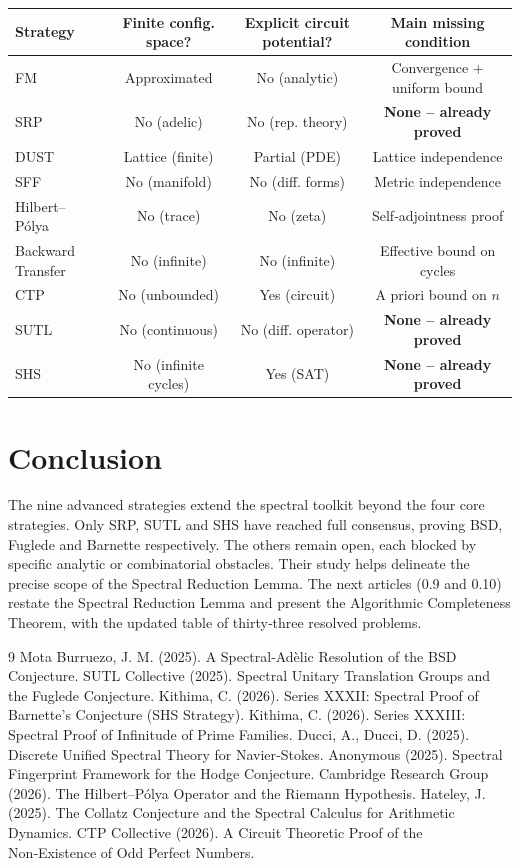 \documentclass[11pt,a4paper]{article}
\begin{document}
\begin{center}
\small
\begin{tabular}{@{}lccc@{}}
\toprule
\textbf{Strategy} & \textbf{Finite config. space?} & \textbf{Explicit circuit potential?} & \textbf{Main missing condition} \\
\midrule
FM & Approximated & No (analytic) & Convergence + uniform bound \\
SRP & No (adelic) & No (rep. theory) & \textbf{None – already proved} \\
DUST & Lattice (finite) & Partial (PDE) & Lattice independence \\
SFF & No (manifold) & No (diff. forms) & Metric independence \\
Hilbert–Pólya & No (trace) & No (zeta) & Self‑adjointness proof \\
Backward Transfer & No (infinite) & No (infinite) & Effective bound on cycles \\
CTP & No (unbounded) & Yes (circuit) & A priori bound on \(n\) \\
SUTL & No (continuous) & No (diff. operator) & \textbf{None – already proved} \\
SHS & No (infinite cycles) & Yes (SAT) & \textbf{None – already proved} \\
\bottomrule
\end{tabular}
\end{center}

\section{Conclusion}

The nine advanced strategies extend the spectral toolkit beyond the four core strategies. Only SRP, SUTL and SHS have reached full consensus, proving BSD, Fuglede and Barnette respectively. The others remain open, each blocked by specific analytic or combinatorial obstacles. Their study helps delineate the precise scope of the Spectral Reduction Lemma. The next articles (0.9 and 0.10) restate the Spectral Reduction Lemma and present the Algorithmic Completeness Theorem, with the updated table of thirty‑three resolved problems.


\begin{thebibliography}{9}
  Mota Burruezo, J. M. (2025). A Spectral‑Adèlic Resolution of the BSD Conjecture.
  SUTL Collective (2025). Spectral Unitary Translation Groups and the Fuglede Conjecture.
  Kithima, C. (2026). Series XXXII: Spectral Proof of Barnette's Conjecture (SHS Strategy).
  Kithima, C. (2026). Series XXXIII: Spectral Proof of Infinitude of Prime Families.
  Ducci, A., Ducci, D. (2025). Discrete Unified Spectral Theory for Navier‑Stokes.
  Anonymous (2025). Spectral Fingerprint Framework for the Hodge Conjecture.
  Cambridge Research Group (2026). The Hilbert–Pólya Operator and the Riemann Hypothesis.
  Hateley, J. (2025). The Collatz Conjecture and the Spectral Calculus for Arithmetic Dynamics.
  CTP Collective (2026). A Circuit Theoretic Proof of the Non‑Existence of Odd Perfect Numbers.
\end{thebibliography}
\end{document}

